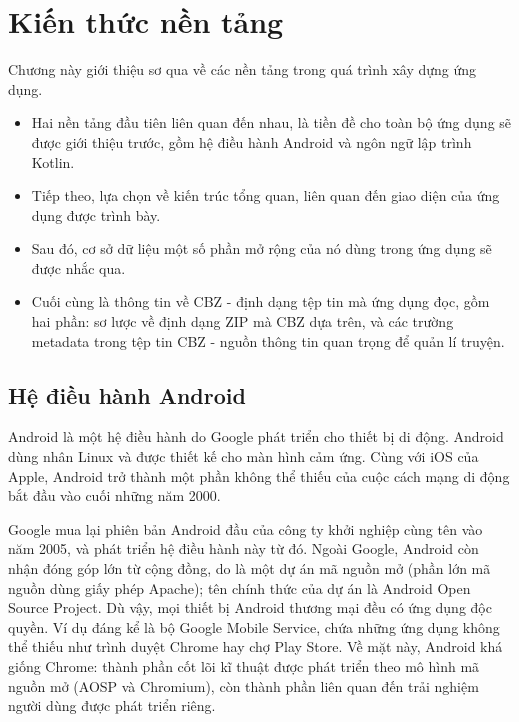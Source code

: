 \documentclass[../../thesis]{subfiles}
\begin{document}
\chapter{Kiến thức nền tảng}

Chương này giới thiệu sơ qua về các nền tảng trong quá trình xây dựng ứng dụng.

\begin{itemize}
    \item
        Hai nền tảng đầu tiên liên quan đến nhau, là tiền đề cho toàn bộ ứng
        dụng sẽ được giới thiệu trước, gồm hệ điều hành Android và ngôn ngữ lập
        trình Kotlin.
    \item
        Tiếp theo, lựa chọn về kiến trúc tổng quan, liên quan đến giao diện của
        ứng dụng được trình bày.
    \item
        Sau đó, cơ sở dữ liệu một số phần mở rộng của nó dùng trong ứng dụng sẽ
        được nhắc qua.
    \item
        Cuối cùng là thông tin về CBZ - định dạng tệp tin mà ứng dụng đọc, gồm
        hai phần: sơ lược về định dạng ZIP mà CBZ dựa trên, và các trường
        metadata trong tệp tin CBZ - nguồn thông tin quan trọng để quản lí
        truyện.
\end{itemize}



\section{Hệ điều hành Android}

Android là một hệ điều hành do Google phát triển cho thiết bị di động. Android
dùng nhân Linux và được thiết kế cho màn hình cảm ứng. Cùng với iOS của Apple,
Android trở thành một phần không thể thiếu của cuộc cách mạng di động bắt đầu
vào cuối những năm 2000.

Google mua lại phiên bản Android đầu của công ty khởi nghiệp cùng tên vào năm
2005, và phát triển hệ điều hành này từ đó. Ngoài Google, Android còn nhận đóng
góp lớn từ cộng đồng, do là một dự án mã nguồn mở (phần lớn mã nguồn dùng giấy
phép Apache); tên chính thức của dự án là Android Open Source Project. Dù vậy,
mọi thiết bị Android thương mại đều có ứng dụng độc quyền. Ví dụ đáng kể là bộ
Google Mobile Service, chứa những ứng dụng không thể thiếu như trình duyệt
Chrome hay chợ Play Store. Về mặt này, Android khá giống Chrome: thành phần cốt
lõi kĩ thuật được phát triển theo mô hình mã nguồn mở (AOSP và Chromium), còn
thành phần liên quan đến trải nghiệm người dùng được phát triển riêng.
\end{document}
